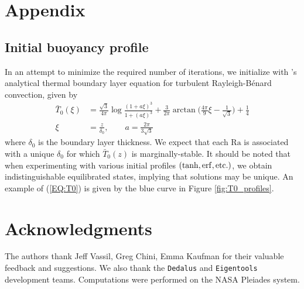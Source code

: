 \documentclass[reprint,amsmath,amssymb,aps]{revtex4-1}
\newcommand\Ra{\mathrm{Ra}}
\begin{document}
\section*{Appendix}
\subsection{Initial buoyancy profile} \label{sec:initial_profile}
In an attempt to minimize the required number of iterations, we initialize with \cite{Shishkina}'s analytical thermal boundary layer equation for turbulent Rayleigh-B\'enard convection, given by 
\begin{align}
    \bar{T}_0(\xi) &= \frac{\sqrt{3}}{4\pi} \log \frac{(1 + a\xi)^3}{1 + (a\xi)^3} + \frac{3}{2\pi} \arctan \Big( \frac{4\pi}{9}\xi - \frac{1}{\sqrt{3}} \Big) + \frac{1}{4} \nonumber \\
    \xi &= \frac{z}{\delta_0}, \qquad a = \frac{2\pi}{3\sqrt{3}}\label{EQ:T0}
\end{align}
where $\delta_0$ is the boundary layer thickness. 
We expect that each $\Ra$ is associated with a unique $\delta_0$ for which $\bar{T}_0(z)$ is marginally-stable. 
It should be noted that when experimenting with various initial profiles $(\tanh, \rm{erf}, \rm{etc.})$, we obtain indistinguishable equilibrated states, implying that solutions may be unique. 
An example of (\ref{EQ:T0}) is given by the blue curve in Figure \ref{fig:T0_profiles}.

\section*{Acknowledgments}
The authors thank Jeff Vassil, Greg Chini, Emma Kaufman for their valuable feedback and suggestions. 
We also thank the \texttt{Dedalus} and \texttt{Eigentools} development teams. 
Computations were performed on the NASA Pleiades system.
\end{document}
